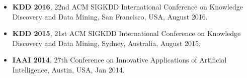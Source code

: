 \begin{itemize}
  \item {\bf KDD 2016}, 22nd ACM SIGKDD International Conference on 
    Knowledge Discovery and Data Mining, San Francisco, USA, August 2016.
  \item {\bf KDD 2015}, 21st ACM SIGKDD International Conference on 
    Knowledge Discovery and Data Mining, Sydney, Australia, August 2015.
  \item {\bf IAAI 2014}, 27th Conference on Innovative Applications of Artificial Intelligence,
    Austin, USA, Jan 2014.
\end{itemize}


